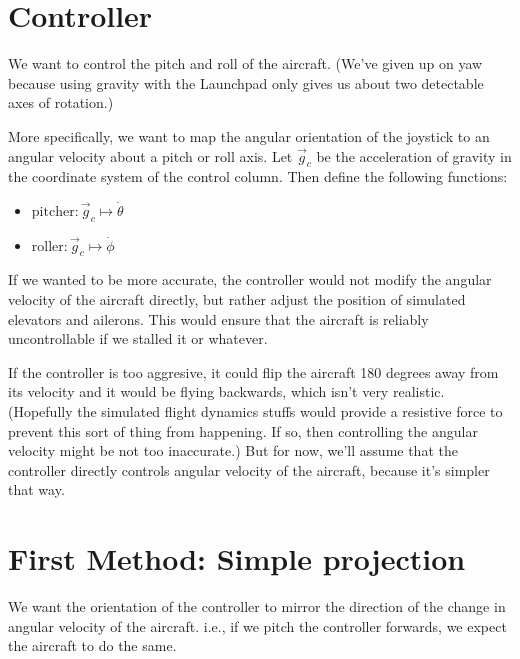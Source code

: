 \documentclass[12pt]{article}
\begin{document}
	\section{Controller}
	
	We want to control the pitch and roll of the aircraft. 
	(We've given up on yaw because using gravity with the Launchpad only gives us about two detectable axes of rotation.)
	
	More specifically, we want to map the angular orientation of the joystick to an angular velocity about a pitch or roll axis. 
	Let $\vec{g}_c$ be the acceleration of gravity in the coordinate system of the control column.
	Then define the following functions:
	\begin{itemize}
		\item $\text{pitcher} : \vec{g}_c \mapsto \dot{\theta}$
		\item $\text{roller} : \vec{g}_c \mapsto \dot{\phi}$
	\end{itemize} 
	
	If we wanted to be more accurate, the controller would not modify the angular velocity of the aircraft directly, 
	but rather adjust the position of simulated elevators and ailerons. 
	This would ensure that the aircraft is reliably uncontrollable if we stalled it or whatever.
	
	If the controller is too aggresive, it could flip the aircraft 180 degrees away from its velocity and it would be flying backwards, which isn't very realistic. 
	(Hopefully the simulated flight dynamics stuffs would provide a resistive force to prevent this sort of thing from happening. 
	If so, then controlling the angular velocity might be not too inaccurate.) But for now, we'll assume that the controller directly controls angular velocity of the aircraft, because it's simpler that way.
	
	\section{First Method: Simple projection}
	
	We want the orientation of the controller to mirror the direction of the change in angular velocity of the aircraft. 
	i.e., if we pitch the controller forwards, we expect the aircraft to do the same. 
	
\end{document}
